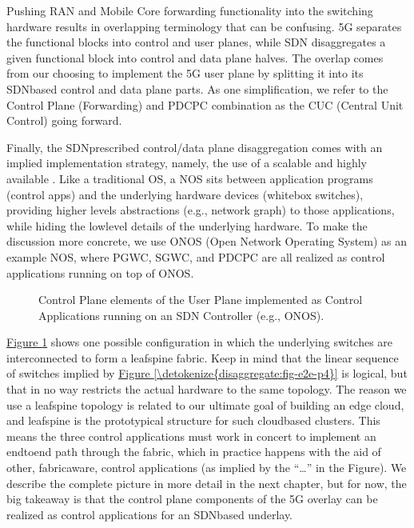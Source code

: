 \documentclass[a4paper,11pt,english]{sphinxmanual}
\let\sphinxpxdimen\pdfpxdimen\else\newdimen\sphinxpxdimen
\begin{document}
\sphinxAtStartPar
Pushing RAN and Mobile Core forwarding functionality into the switching
hardware results in overlapping terminology that can be confusing.
5G separates the functional blocks into control and user planes,
while SDN disaggregates a given functional block into control and data
plane halves. The overlap comes from our choosing to implement
the 5G user plane by splitting it into its SDN\sphinxhyphen{}based control and data
plane parts. As one simplification, we refer to the Control Plane
(Forwarding) and PDCP\sphinxhyphen{}C combination as the CU\sphinxhyphen{}C (Central Unit \sphinxhyphen{} Control)
going forward.

\sphinxAtStartPar
Finally, the SDN\sphinxhyphen{}prescribed control/data plane disaggregation comes with
an implied implementation strategy, namely, the use of a scalable and
highly available . Like a traditional
OS, a NOS sits between application programs (control apps) and the
underlying hardware devices (whitebox switches), providing higher levels
abstractions (e.g., network graph) to those applications, while hiding
the low\sphinxhyphen{}level details of the underlying hardware. To make the discussion
more concrete, we use ONOS (Open Network Operating System) as an example
NOS, where PGW\sphinxhyphen{}C, SGW\sphinxhyphen{}C, and PDCP\sphinxhyphen{}C are all realized as control
applications running on top of ONOS.

\begin{figure}[ht]
\centering
\capstart

\noindent\sphinxincludegraphics[width=400\sphinxpxdimen]{{Slide23}.png}
\caption{Control Plane elements of the User Plane implemented
as Control Applications running on an SDN Controller (e.g., ONOS).}\label{\detokenize{disaggregate:id3}}\label{\detokenize{disaggregate:fig-onos}}\end{figure}

\sphinxAtStartPar
\hyperref[\detokenize{disaggregate:fig-onos}]{Figure \ref{\detokenize{disaggregate:fig-onos}}} shows one possible configuration in
which the underlying switches are interconnected to form a leaf\sphinxhyphen{}spine
fabric. Keep in mind that the linear sequence of switches implied by
\hyperref[\detokenize{disaggregate:fig-e2e-p4}]{Figure \ref{\detokenize{disaggregate:fig-e2e-p4}}} is logical, but that in no way
restricts the actual hardware to the same topology. The reason we use
a leaf\sphinxhyphen{}spine topology is related to our ultimate goal of building an
edge cloud, and leaf\sphinxhyphen{}spine is the prototypical structure for such
cloud\sphinxhyphen{}based clusters.  This means the three control applications must
work in concert to implement an end\sphinxhyphen{}to\sphinxhyphen{}end path through the fabric,
which in practice happens with the aid of other, fabric\sphinxhyphen{}aware, control
applications (as implied by the “…” in the Figure). We describe the
complete picture in more detail in the next chapter, but for now, the
big takeaway is that the control plane components of the 5G overlay
can be realized as control applications for an SDN\sphinxhyphen{}based underlay.
\end{document}
